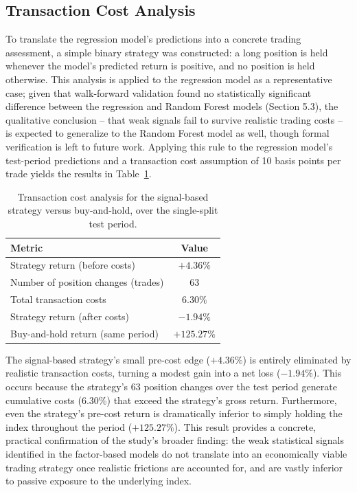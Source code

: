 \documentclass[11pt]{article}
\begin{document}
\subsection{Transaction Cost Analysis}

To translate the regression model's predictions into a concrete trading assessment, a simple binary strategy was constructed: a long position is held whenever the model's predicted return is positive, and no position is held otherwise. This analysis is applied to the regression model as a representative case; given that walk-forward validation found no statistically significant difference between the regression and Random Forest models (Section 5.3), the qualitative conclusion -- that weak signals fail to survive realistic trading costs -- is expected to generalize to the Random Forest model as well, though formal verification is left to future work. Applying this rule to the regression model's test-period predictions and a transaction cost assumption of 10 basis points per trade yields the results in Table~\ref{tab:transaction_costs}.

\begin{table}[h]
\centering
\begin{tabular}{lc}
\toprule
Metric & Value \\
\midrule
Strategy return (before costs) & $+4.36\%$ \\
Number of position changes (trades) & 63 \\
Total transaction costs & $6.30\%$ \\
Strategy return (after costs) & $-1.94\%$ \\
Buy-and-hold return (same period) & $+125.27\%$ \\
\bottomrule
\end{tabular}
\caption{Transaction cost analysis for the signal-based strategy versus buy-and-hold, over the single-split test period.}
\label{tab:transaction_costs}
\end{table}

The signal-based strategy's small pre-cost edge ($+4.36\%$) is entirely eliminated by realistic transaction costs, turning a modest gain into a net loss ($-1.94\%$). This occurs because the strategy's 63 position changes over the test period generate cumulative costs (6.30\%) that exceed the strategy's gross return. Furthermore, even the strategy's pre-cost return is dramatically inferior to simply holding the index throughout the period ($+125.27\%$). This result provides a concrete, practical confirmation of the study's broader finding: the weak statistical signals identified in the factor-based models do not translate into an economically viable trading strategy once realistic frictions are accounted for, and are vastly inferior to passive exposure to the underlying index.
\end{document}
